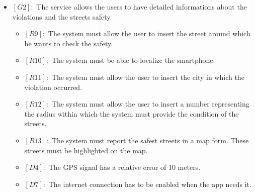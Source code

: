 \documentclass[titlepage]{article}
\begin{document}
\begin{itemize}
\begin{itemize}
 \end{itemize}
 \item $[G2]:$ The service allows the users to have detailed informations about the violations and the streets safety.
 \begin{itemize}
 	\item $[R9]:$ The system must allow the user to insert the street around which he wants to check the safety.
 	\item $[R10]:$ The system must be able to localize the smartphone.
 	\item $[R11]:$ The system must allow the user to insert the city in which the violation occurred.
 	\item $[R12]:$ The system must allow the user to insert a number representing the radius within which the system must provide the condition of the streets.
 	\item $[R13]:$ The system must report the  safest streets in a map form. These streets must be highlighted on the map.
 	\item $[D4]:$ The GPS signal has a relative error of 10 meters.
 	\item $[D7]:$ The internet connection has to be enabled when the app needs it.
 \end{itemize}
\end{itemize}
\end{document}

